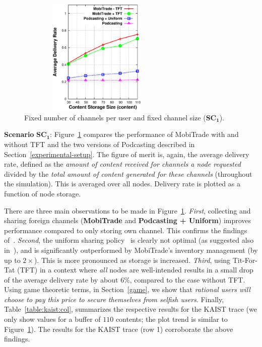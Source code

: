 \begin{figure}[!h]
  \begin{center}
    \includegraphics[width=3in,height=2.2in]{Chapitre5/fig5.eps}
  \end{center}
  \caption{Fixed number of channels per user and fixed channel size ($\mathbf{SC_1}$).}
  \label{CS+FNC+FCS}
\end{figure}

\noindent \textbf{Scenario} $\mathbf{SC_{1}}$: Figure~\ref{CS+FNC+FCS} compares the performance of MobiTrade with and without TFT and the two versions of Podcasting described in Section~\ref{experimental-setup}. The figure of merit is, again, the average delivery rate, defined as the \emph{amount of content received for channels a node requested} divided by the \emph{total amount of content generated for these channels} (throughout the simulation). This is averaged over all nodes. Delivery rate is plotted as a function of node storage.

There are three main observations to be made in Figure~\ref{CS+FNC+FCS}. \emph{First}, collecting and sharing foreign channels (\textbf{MobiTrade} and \textbf{Podcasting + Uniform}) improves performance compared to only storing own channel. This confirms the findings of~\cite{Podcasting:Secon07}. \emph{Second}, the uniform sharing policy~\cite{Podcasting:Secon07} is clearly not optimal (as suggested also in~\cite{OptimalChannelChoice}), and is significantly outperformed by MobiTrade's inventory management (by up to $2 \times$). This is more pronounced as storage is increased. \emph{Third}, using Tit-For-Tat (TFT) in a context where \emph{all} nodes are well-intended results in a small drop of the average delivery rate by about $6\%$, compared to the case without TFT. Using game theoretic terms, in Section~\ref{game}, we show that \emph{rational users will choose to pay this price to secure themselves from selfish users}. Finally,  Table~\ref{table:kaist:col}, summarizes the respective results for the KAIST trace (we only show values for a buffer of $110$ contents; the plot trend is similar to Figure~\ref{CS+FNC+FCS}). The results for the KAIST trace (row 1) corroborate the above findings.

